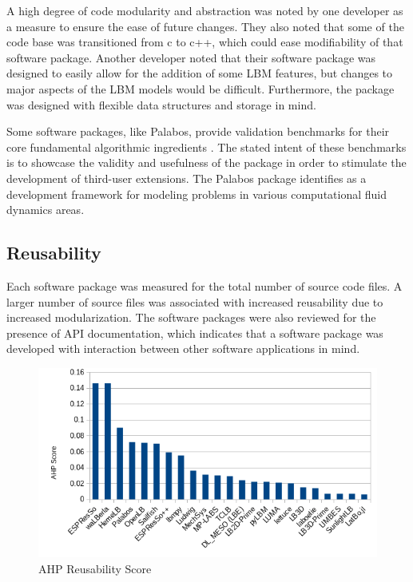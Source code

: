 \documentclass[12pt, notitlepage]{article}
\begin{document}
A high degree of code modularity and abstraction was noted by one developer as a measure to ensure the ease of future changes. They also noted that some of the code base was transitioned from c to c++, which could ease modifiability of that software package. Another developer noted that their software package was designed to easily allow for the addition of some LBM features, but changes to major aspects of the LBM models would be difficult. Furthermore, the package was designed with flexible data structures and storage in mind. 

Some software packages, like Palabos, provide validation benchmarks for their core fundamental algorithmic ingredients \citep{latt2021palabos}. The stated intent of these benchmarks is to showcase the validity and usefulness of the package in order to stimulate the development of third-user extensions. The Palabos package identifies as a development framework for modeling problems in various computational fluid dynamics areas. 

\subsection{Reusability}

Each software package was measured for the total number of source code files. A larger number of source files was associated with increased reusability due to increased modularization. The software packages were also reviewed for the presence of API documentation, which indicates that a software package was developed with interaction between other software applications in mind. 

\begin{figure}[h!]
	\begin{center}
		\includegraphics[width=1.0\textwidth]{reusability_chart}
		\caption{AHP Reusability Score}
		\label{Fig_Reusabilty}
	\end{center}
\end{figure}
\end{document}
